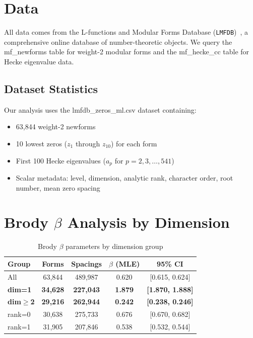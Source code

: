 \documentclass[11pt, a4paper]{article}
\newcommand{\LMFDB}{\texttt{LMFDB}}
\begin{document}
\section{Data}
\label{sec:data}

All data comes from the L-functions and Modular Forms Database (\LMFDB{})~\cite{lmfdb}, a comprehensive online database of number-theoretic objects. We query the {\ttfamily mf\_newforms} table for weight-2 modular forms and the {\ttfamily mf\_hecke\_cc} table for Hecke eigenvalue data.

\subsection{Dataset Statistics}

Our analysis uses the {\ttfamily lmfdb\_zeros\_ml.csv} dataset containing:
\begin{itemize}
\item 63,844 weight-2 newforms
\item 10 lowest zeros ($z_1$ through $z_{10}$) for each form
\item First 100 Hecke eigenvalues ($a_p$ for $p=2,3,\ldots,541$)
\item Scalar metadata: level, dimension, analytic rank, character order, root number, mean zero spacing
\end{itemize}

\section{Brody $\beta$ Analysis by Dimension}
\label{sec:exp15}

\begin{table}[h]
\centering
\caption{Brody $\beta$ parameters by dimension group}
\label{tab:beta_by_dim}
\begin{tabular}{lcccc}
\toprule
Group & Forms & Spacings & $\beta$ (MLE) & 95\% CI \\ \midrule
All & 63,844 & 489,987 & 0.620 & [0.615, 0.624] \\
\textbf{dim=1} & \textbf{34,628} & \textbf{227,043} & \textbf{1.879} & \textbf{[1.870, 1.888]} \\
\textbf{dim$\geq$2} & \textbf{29,216} & \textbf{262,944} & \textbf{0.242} & \textbf{[0.238, 0.246]} \\ \midrule
rank=0 & 30,638 & 275,733 & 0.676 & [0.670, 0.682] \\
rank=1 & 31,905 & 207,846 & 0.538 & [0.532, 0.544] \\
\bottomrule
\end{tabular}
\end{table}
\end{document}
